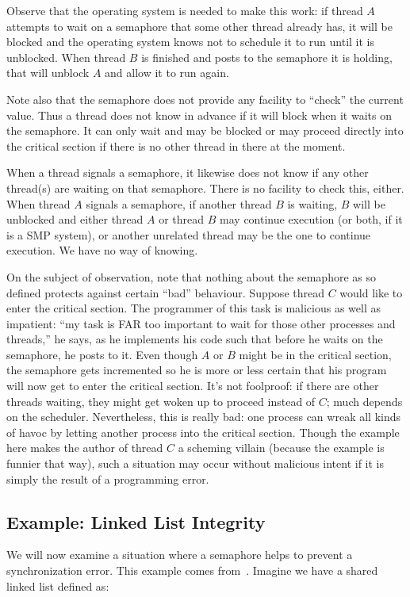 Observe that the operating system is needed to make this work: if thread $A$ attempts to wait on a semaphore that some other thread already has, it will be blocked and the operating system knows not to schedule it to run until it is unblocked. When thread $B$ is finished and posts to the semaphore it is holding, that will unblock $A$ and allow it to run again.

Note also that the semaphore does not provide any facility to ``check'' the current value. Thus a thread does not know in advance if it will block when it waits on the semaphore. It can only wait and may be blocked or may proceed directly into the critical section if there is no other thread in there at the moment.

When a thread signals a semaphore, it likewise does not know if any other thread(s) are waiting on that semaphore. There is no facility to check this, either. When thread $A$ signals a semaphore, if another thread $B$ is waiting, $B$ will be unblocked and either thread $A$ or thread $B$ may continue execution (or both, if it is a SMP system), or another unrelated thread may be the one to continue execution. We have no way of knowing.

On the subject of observation, note that nothing about the semaphore as so defined protects against certain ``bad'' behaviour. Suppose thread $C$ would like to enter the critical section. The programmer of this task is malicious as well as impatient: ``my task is FAR too important to wait for those other processes and threads,'' he says, as he implements his code such that before he waits on the semaphore, he posts to it. Even though $A$ or $B$ might be in the critical section, the semaphore gets incremented so he is more or less certain that his program will now get to enter the critical section. It's not foolproof: if there are other threads waiting, they might get woken up to proceed instead of $C$; much depends on the scheduler. Nevertheless, this is really bad: one process can wreak all kinds of havoc by letting another process into the critical section. Though the example here makes the author of thread $C$ a scheming villain (because the example is funnier that way), such a situation may occur without malicious intent if it is simply the result of a programming error.

\subsection*{Example: Linked List Integrity}
We will now examine a situation where a semaphore helps to prevent a synchronization error. This example comes from~\cite{mte241}. Imagine we have a shared linked list defined as:

